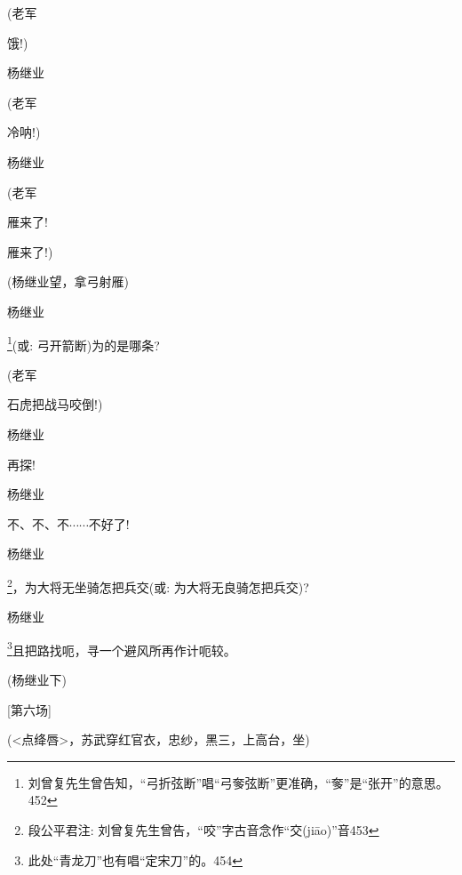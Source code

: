 {{(老军\hspace{30pt}~

饿!)}

{杨继业\hspace{20pt}~

 }

{(老军\hspace{30pt}~

冷呐!)}

{杨继业\hspace{20pt}~

 }

{(老军\hspace{30pt}~

雁来了!

雁来了!)}

{(杨继业望，拿弓射雁)}

{杨继业

\footnote{ 刘曾复先生曾告知，``弓折弦断''唱``弓奓弦断''更准确，``奓''是``张开''的意思。{452}}{({\akai 或}: 弓开箭断)为的是哪条?} }

{(老军\hspace{30pt}~

石虎把战马咬倒!)}

{杨继业\hspace{20pt}~

再探!}

{杨继业\hspace{20pt}~

不、不、不$\cdots{}\cdots{}$不好了!}

{杨继业

\footnote{ 段公平君注: 刘曾复先生曾告，``咬''字古音念作``交(jiāo)''音{453}}{，为大将无坐骑怎把兵交({\akai 或}: 为大将无良骑怎把兵交)?} }

{杨继业

\footnote{ 此处``青龙刀''也有唱``定宋刀''的。{454}}{且把路找呃，寻一个避风所再作计呃较。} }

{(杨继业下)}

{[}第六场{]}

{(\textless{}点绛唇\textgreater{}，苏武穿红官衣，忠纱，黑三，上高台，坐)}

}
